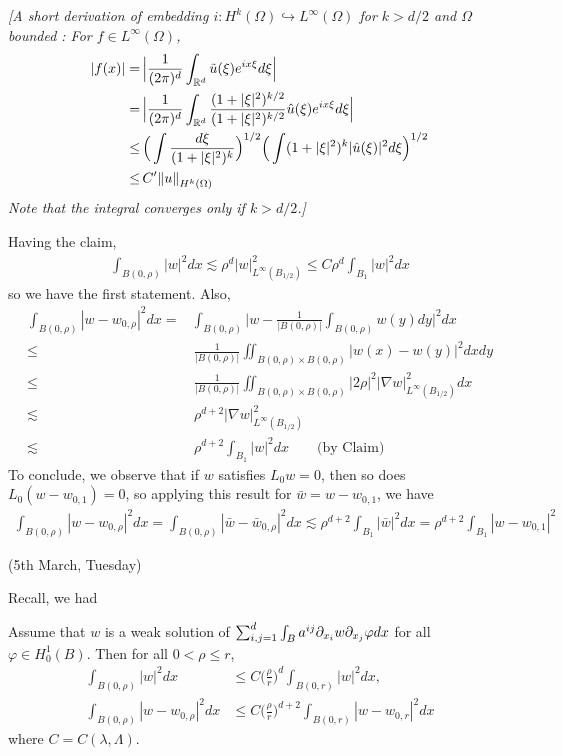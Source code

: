 \documentclass[12pt,a4paper]{article}
\newenvironment{proof}
{\begin{changemargin}{0.5cm}{0.5cm} 
	}%
	{\end{changemargin}
}
\newenvironment{subproof}
{\begin{changemargin}{0.5cm}{0.5cm} 
	}%
	{\end{changemargin}
}
\newenvironment{p}
{\begin{proof} 
	}%
	{\end{proof}
}
\begin{document}
\begin{p}
\begin{subproof}
\emph{[A short derivation of embedding $i : H^k(\Omega) \hookrightarrow L^{\infty}(\Omega)$ for $k>d/2$ and $\Omega$ bounded : For $f\in L^{\infty}(\Omega)$,
\begin{align*}
|f(x)| =&\, \Big| \frac{1}{(2\pi)^d} \int_{\reals^d} \tilde{u}(\xi) e^{ix\xi} d\xi\Big| \\
=&\, \Big| \frac{1}{(2\pi)^d}\int_{\reals^d} \frac{(1+|\xi|^2)^{k/2}}{(1+|\xi|^2)^{k/2}}\hat{u}(\xi)e^{ix\xi} d\xi \Big| \\
\leq &\, \Big( \int \frac{d\xi}{(1+|\xi|^2)^{k}}\Big)^{1/2}\Big( \int (1+|\xi|^2)^{k}|\hat{u}(\xi)|^2 d\xi\Big)^{1/2} \\
\leq &\, C' \snorms{u}{H^k(\Omega)} 
\end{align*}
Note that the integral converges only if $k>d/2$.]}
\end{subproof}
Having the claim,
\begin{align*}
\int_{B(0, \rho)} |w|^2 dx \lesssim \rho^d |w|^2_{L^{\infty}(B_{1/2})} \leq C \rho^d \int_{B_1} |w|^2 dx
\end{align*}
so we have the first statement. Also,
\begin{align*}
\int_{B(0, \rho)}|w - w_{0, \rho}|^2 dx =& \int_{B(0, \rho)}\Big|w - \frac{1}{|B(0, \rho)|} \int_{B(0, \rho)} w(y) dy \Big|^2 dx \\
\leq & \, \frac{1}{|B(0, \rho)|} \iint_{B(0, \rho) \times B(0, \rho)} |w(x) - w(y)|^2 dxdy \\
\leq & \, \frac{1}{|B(0, \rho)|} \iint_{B(0, \rho) \times B(0, \rho)} |2 \rho|^2 |\nabla w|_{L^{\infty}(B_{1/2})}^2 dx \\
\lesssim & \,\rho^{d+2} |\nabla w|_{L^{\infty}(B_{1/2})}^2 \\
\lesssim & \, \rho^{d+2} \int_{B_1} |w|^2 dx \quad \quad \text{(by Claim)}
\end{align*}
To conclude, we observe that if $w$ satisfies $L_0 w=0$, then so does $L_0 (w - w_{0,1})=0$, so applying this result for $\bar{w} = w-w_{0,1}$, we have
\begin{align*}
\int_{B(0, \rho)}|w - w_{0, \rho}|^2 dx = \int_{B(0, \rho)}|\bar{w} - \bar{w}_{0, \rho}|^2 dx \lesssim \rho^{d+2} \int_{B_1} |\bar w|^2 dx = \rho^{d+2} \int_{B_1} |w-w_{0,1}|^2
\end{align*}
\eop
\end{p}
\s

\newday

(5th March, Tuesday)
\s

Recall, we had
\s

\prop Assume that $w$ is a weak solution of $\sum_{i,j=1}^d \int_B a^{ij} \partial_{x_i} w \partial_{x_j} \varphi dx$ for all $\varphi \in H_0^1(B)$. Then for all  $0< \rho \leq r$, 
\begin{align*}
\int_{B(0, \rho)} |w|^2 dx &\leq C\big( \frac{\rho}{r} \big)^d \int_{B(0, r)} |w|^2 dx,\\
\int_{B(0, \rho)} |w - w_{0, \rho}|^2 dx &\leq C \big(\frac{\rho}{r} \big)^{d+2} \int_{B(0,r)} |w- w_{0,r}|^2 dx
\end{align*}
where $C= C(\lambda, \Lambda)$.
\s
\end{document}
